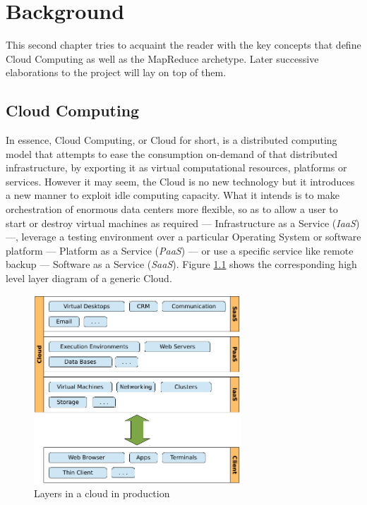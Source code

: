 \chapter{Background}\label{cap:estadodelarte}

\noindent This second chapter tries to acquaint the reader with the key concepts that define Cloud Computing as well as the MapReduce archetype. Later successive elaborations to the project will lay on top of them.


\section{Cloud Computing}\label{sec:computacioncloud}

\noindent In essence, Cloud Computing, or Cloud for short, is a distributed computing model that attempts to ease the consumption on-demand of that distributed infrastructure, by exporting it as virtual computational resources, platforms or services. However it may seem, the Cloud is no new technology but it introduces a new manner to exploit idle computing capacity. What it intends is to make orchestration of enormous data centers more flexible, so as to allow a user to start or destroy virtual machines as required --- Infrastructure as a Service (\emph{IaaS}) ---, leverage a testing environment over a particular Operating System or software platform --- Platform as a Service (\emph{PaaS}) --- or use a specific service like remote backup --- Software as a Service (\emph{SaaS}). Figure \ref{fig:cloudlayers} shows the corresponding high level layer diagram of a generic Cloud.

\begin{figure}[tbp]
\begin{center}
\includegraphics[width=0.69\textwidth]{imagenes/003.pdf}
 \caption{Layers in a cloud in production}
\label{fig:cloudlayers}
\end{center}
\end{figure}

